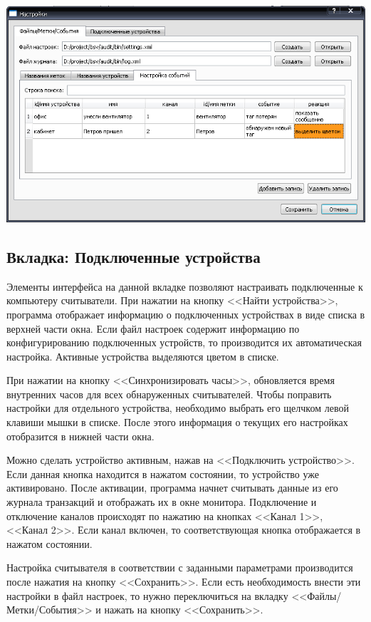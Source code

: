 \begin{center}
    \includegraphics[scale=0.5]{img/settings_event.png}
\end{center}

\subsection{Вкладка: Подключенные устройства}

Элементы интерфейса на данной вкладке позволяют настраивать подключенные к компьютеру считыватели.
При нажатии на кнопку <<Найти устройства>>, программа отображает информацию о подключенных устройствах в
виде списка в верхней части окна. Если файл настроек содержит информацию по конфигурированию подключенных устройств, то
производится их автоматическая настройка. Активные устройства выделяются цветом в списке.

При нажатии на кнопку <<Синхронизировать часы>>, обновляется время внутренних часов для всех обнаруженных считывателей.
Чтобы поправить настройки для отдельного устройства, необходимо выбрать его щелчком левой клавиши мышки в списке.
После этого информация о текущих его настройках отобразится в нижней части окна. 

Можно сделать устройство активным, нажав на
<<Подключить устройство>>. Если данная кнопка находится в нажатом состоянии, то устройство уже активировано.
После активации, программа начнет считывать данные из его журнала транзакций и 
отображать их в окне монитора. Подключение и отключение каналов происходят по нажатию на кнопках <<Канал 1>>, <<Канал 2>>.
Если канал включен, то соответствующая кнопка отображается в нажатом состоянии.

Настройка считывателя в соответствии с заданными параметрами производится после нажатия на кнопку <<Сохранить>>.
Если есть необходимость внести эти настройки в файл настроек, то нужно переключиться на вкладку <<Файлы/Метки/События>>
 и нажать на кнопку <<Сохранить>>.

